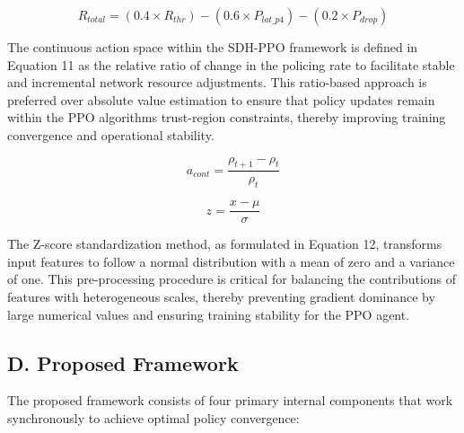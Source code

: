 \begin{equation}\label{eq:10}
R_{total} = \left( 0.4 \times R_{thr} \right) - \left( 0.6 \times P_{lat\text{\_}p4} \right) - \left( 0.2 \times P_{drop} \right)
\end{equation}

The continuous action space within the SDH-PPO framework is defined in Equation 11 as the relative ratio of change in the policing rate to facilitate stable and incremental network resource adjustments. This ratio-based approach is preferred over absolute value estimation to ensure that policy updates remain within the PPO algorithm\textquotesingle s trust-region constraints, thereby improving training convergence and operational stability.

\begin{equation}\label{eq:11}
a_{cont} = \frac{\rho_{t + 1} - \rho_{t}}{\rho_{t}}
\end{equation}

\begin{equation}\label{eq:12}
z = \frac{x - \mu}{\sigma}
\end{equation}

The Z-score standardization method, as formulated in Equation 12, transforms input features to follow a normal distribution with a mean of zero and a variance of one. This pre-processing procedure is critical for balancing the contributions of features with heterogeneous scales, thereby preventing gradient dominance by large numerical values and ensuring training stability for the PPO agent.

\subsection{D. Proposed Framework}\label{d.-proposed-framework}

The proposed framework consists of four primary internal components that work synchronously to achieve optimal policy convergence:

